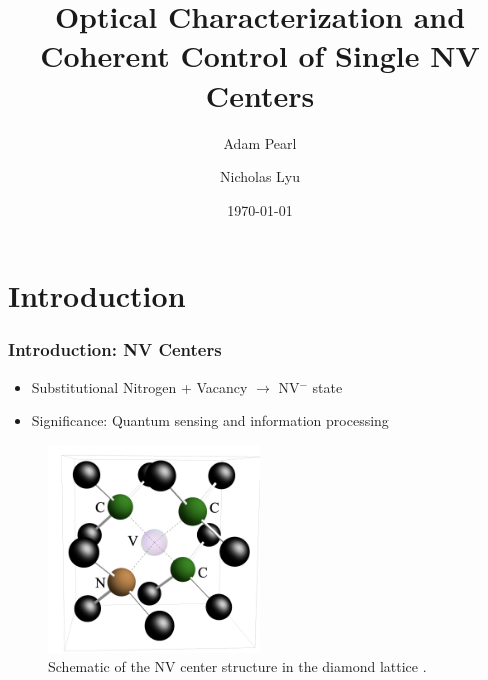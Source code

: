 \documentclass{beamer}
\title[NV Center Presentation]{Optical Characterization and Coherent Control of Single NV Centers} %
\author{Adam Pearl \and Nicholas Lyu}
\institute[Harvard Physics]{Department of Physics \\ Harvard University}
\date{\today} %
\begin{document}
\begin{frame}
\titlepage %
\end{frame}


\section{Introduction}

\begin{frame}
    \frametitle{Introduction: NV Centers}
    \begin{itemize}
        \item Substitutional Nitrogen + Vacancy $\rightarrow$ NV$^{-}$ state \cite{doherty2013nitrogen}
        \item Significance: Quantum sensing and information processing
    \end{itemize}
    \begin{figure}
        \centering
        \includegraphics[width=0.5\textwidth]{./figs/lattice.png} %
        \caption{Schematic of the NV center structure in the diamond lattice \cite{doherty2013nitrogen}.}
        \label{fig:nv_structure_pres}
    \end{figure}
\end{frame}
\end{document}
